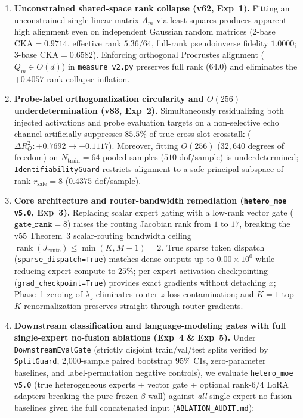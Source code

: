 \documentclass[10pt]{article}
\theoremstyle{definition}
\theoremstyle{plain}
\theoremstyle{remark}
\begin{document}
\begin{enumerate}[leftmargin=1.6em, itemsep=1pt, parsep=0pt]
    \item \textbf{Unconstrained shared-space rank collapse (v62, Exp~1).} Fitting an unconstrained single linear matrix $A_m$ via least squares produces apparent high alignment even on independent Gaussian random matrices ($2$-base $\mathrm{CKA}=0.9714$, effective rank $5.36/64$, full-rank pseudoinverse fidelity $1.0000$; $3$-base $\mathrm{CKA}=0.6582$). Enforcing orthogonal Procrustes alignment ($Q_m \in O(d)$) in \texttt{measure\_v2.py} preserves full rank ($64.0$) and eliminates the $+0.4057$ rank-collapse inflation.
    \item \textbf{Probe-label orthogonalization circularity and $O(256)$ underdetermination (v83, Exp~2).} Simultaneously residualizing both injected activations and probe evaluation targets on a non-selective echo channel artificially suppresses $85.5\%$ of true cross-slot crosstalk ($\Delta R^2_O: +0.7692 \to +0.1117$). Moreover, fitting $O(256)$ ($32{,}640$ degrees of freedom) on $N_{\text{train}}{=}64$ pooled samples ($510$ dof/sample) is underdetermined; \texttt{IdentifiabilityGuard} restricts alignment to a safe principal subspace of rank $r_{\text{safe}}{=}8$ ($0.4375$ dof/sample).
    \item \textbf{Core architecture and router-bandwidth remediation (\texttt{hetero\_moe v5.0}, Exp~3).} Replacing scalar expert gating with a low-rank vector gate ($\texttt{gate\_rank}=8$) raises the routing Jacobian rank from $1$ to $17$, breaking the v55 Theorem~3 scalar-routing bandwidth ceiling $\operatorname{rank}(J_{\text{route}}) \le \min(K, M-1)=2$. True sparse token dispatch (\texttt{sparse\_dispatch=True}) matches dense outputs up to $0.00\times 10^0$ while reducing expert compute to $25\%$; per-expert activation checkpointing (\texttt{grad\_checkpoint=True}) provides exact gradients without detaching $x$; Phase~1 zeroing of $\lambda_z$ eliminates router $z$-loss contamination; and $K{=}1$ top-$K$ renormalization preserves straight-through router gradients.
    \item \textbf{Downstream classification and language-modeling gates with full single-expert no-fusion ablations (Exp~4 \& Exp~5).} Under \texttt{DownstreamEvalGate} (strictly disjoint train/val/test splits verified by \texttt{SplitGuard}, 2{,}000-sample paired bootstrap $95\%$ CIs, zero-parameter baselines, and label-permutation negative controls), we evaluate \texttt{hetero\_moe v5.0} (true heterogeneous experts + vector gate + optional rank-$6$/$4$ LoRA adapters breaking the pure-frozen $\beta$ wall) against \emph{all} single-expert no-fusion baselines given the full concatenated input (\texttt{ABLATION\_AUDIT.md}):

\end{enumerate}
\end{document}
